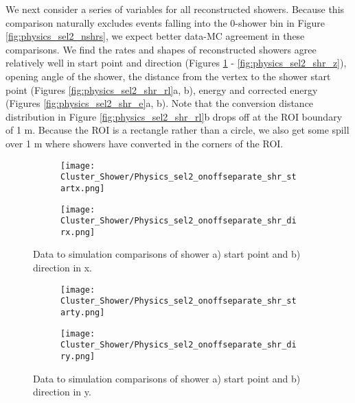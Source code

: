 \documentclass{article}
\begin{document}
\noindent We next consider a series of variables for all reconstructed showers. Because this comparison naturally excludes events falling into the 0-shower bin in Figure \ref{fig:physics_sel2_nshrs}, we expect better data-MC agreement in these comparisons. We find the rates and shapes of reconstructed showers agree relatively well in start point and direction (Figures \ref{fig:physics_sel2_shr_x} - \ref{fig:physics_sel2_shr_z}), opening angle of the shower, the distance from the vertex to the shower start point (Figures \ref{fig:physics_sel2_shr_rl}a, b), energy and corrected energy (Figures \ref{fig:physics_sel2_shr_e}a, b).  Note that the conversion distance distribution in Figure \ref{fig:physics_sel2_shr_rl}b drops off at the ROI boundary of 1 m.  Because the ROI is a rectangle rather than a circle, we also get some spill over 1 m where showers have converted in the corners of the ROI. 

\begin{figure}[t!]
\centering
  \begin{subfigure}[t]{0.3\textwidth}
    \centering
\texttt{[image: Cluster\_Shower/Physics\_sel2\_onoffseparate\_shr\_startx.png]}
  \caption{ }
  \end{subfigure} 
  \hspace{30mm}
  \begin{subfigure}[t]{0.3\textwidth}
    \centering
\texttt{[image: Cluster\_Shower/Physics\_sel2\_onoffseparate\_shr\_dirx.png]}
  \caption{ }
  \end{subfigure} 
\caption{ Data to simulation comparisons of shower a) start point and b) direction in x.}
\label{fig:physics_sel2_shr_x}
\end{figure}


\begin{figure}[h!]
\centering
  \begin{subfigure}[t]{0.3\textwidth}
    \centering
\texttt{[image: Cluster\_Shower/Physics\_sel2\_onoffseparate\_shr\_starty.png]}
  \caption{ }
  \end{subfigure} 
  \hspace{30mm}
  \begin{subfigure}[t]{0.3\textwidth}
    \centering
\texttt{[image: Cluster\_Shower/Physics\_sel2\_onoffseparate\_shr\_diry.png]}
  \caption{ }
  \end{subfigure} 

\caption{ Data to simulation comparisons of shower a) start point and b) direction in y.}
\label{fig:physics_sel2_shr_y}
\end{figure}
\end{document}
